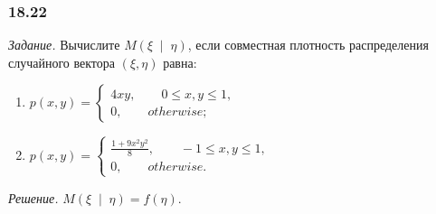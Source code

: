 \subsubsection*{18.22}

\textit{Задание.}
Вычислите $M \left( \xi \; \middle| \; \eta \right) $,
если совместная плотность распределения случайного вектора $ \left( \xi, \eta \right) $ равна:
\begin{enumerate}[label=\alph*)]
  \item $p \left( x, y \right) =
    \begin{cases}
      4xy, \qquad 0 \leq x, y \leq 1, \\
      0, \qquad otherwise;
    \end{cases}$
  \item $p \left( x, y \right) =
    \begin{cases}
      \frac{1 + 9x^2 y^2}{8}, \qquad -1 \leq x, y \leq 1, \\
      0, \qquad otherwise.
    \end{cases}$
\end{enumerate}

\textit{Решение.} $M \left( \xi \; \middle| \; \eta \right) = f \left( \eta \right) $.

